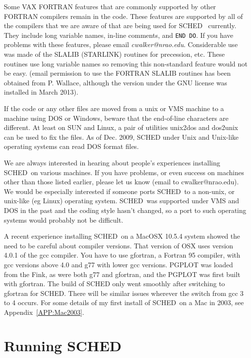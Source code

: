 \documentclass{report}
\newcommand{\sched}{{\sc SCHED}}
\newcommand{\schedb}{{\sc SCHED~}}
\begin{document}
\begin{description}
\end{description}

Some VAX FORTRAN features that are commonly supported by other FORTRAN
compilers remain in the code.  These features are supported by all of
the compilers that we are aware of that are being used for \schedb
currently.  They include long variable names, in-line comments, and
{\tt END DO}.  If you have problems with these features, please email
{\sl cwalker@nrao.edu}.  Considerable use was made of the SLALIB
(STARLINK) routines for precession, etc.  These routines use long
variable names so removing this non-standard feature would not be
easy.  (email permission to use the FORTRAN SLALIB routines has been
obtained from P. Wallace, although the version under the GNU license
was installed in March 2013).

If the code or any other files are moved from a unix or VMS machine to
a machine using DOS or Windows, beware that the end-of-line characters
are different.  At least on SUN and Linux, a pair of utilities
unix2dos and dos2unix can be used to fix the files.  As of Dec. 2009,
SCHED under Unix and Unix-like operating systems can read DOS format
files.

We are always interested in hearing about people's experiences
installing \schedb on various machines.  If you have problems, or even
success on machines other than those listed earlier, please let us
know (email to cwalker@nrao.edu).  We would be especially interested
if someone ports \schedb to a non-unix, or unix-like (eg Linux)
operating system.  \schedb was supported under VMS and DOS in the
past and the coding style hasn't changed, so a port to such operating
systems would probably not be difficult.

A recent experience installing \schedb on a MacOSX 10.5.4 system
showed the need to be careful about compiler versions.  That version
of OSX uses version 4.0.1 of the gcc compiler.  You have to use
gfortran, a Fortran 95 compiler, with gcc versions above 4.0 and g77
with lower gcc versions.  PGPLOT was loaded from the Fink, as were
both g77 and gfortran, and the PGPLOT was first built with gfortran.
The build of SCHED only went smoothly after switching to gfortran for
\sched.  There will be similar issues wherever the switch from gcc 3
to 4 occurs.  For some details of my first install of \schedb on a Mac
in 2003, see Appendix~\ref{APP:Mac2003}.


\section{\label{SEC:RUNSCHED}Running SCHED}
\end{document}
